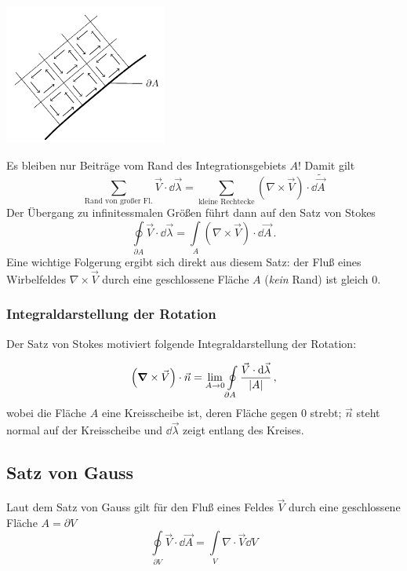 \documentclass[paper=a4, fontsize=11.0pt, abstractoff, DIV12]{scrartcl}
\begin{document}
\begin{center}
    \includegraphics[width=0.4\textwidth]{Figures/Stokes2}
\end{center}
Es bleiben nur Beiträge vom Rand des Integrationsgebiets $A$! Damit gilt 
\begin{equation*}
\sum\limits_{\text{Rand von großer Fl.}} \vec V\cdot \dd \vec\lambda = \sum\limits_{\text{kleine Rechtecke}} \left(\nabla\times\vec V\right)\cdot \dd \tilde{\vec A}
\end{equation*}
Der Übergang zu infinitessmalen Größen führt dann auf den Satz von Stokes
\begin{equation*}
\oint\limits_{\partial A} \vec V \cdot \dd \vec \lambda = \int\limits_{A} \left(\nabla\times\vec V\right)\cdot \dd \vec A\,.
\end{equation*}
Eine wichtige Folgerung ergibt sich direkt aus diesem Satz: der Fluß eines
Wirbelfeldes $\nabla\times\vec V$ durch eine geschlossene Fläche $A$ (\emph
{kein} Rand) ist gleich $0$.

\subsubsection{Integraldarstellung der Rotation}

Der Satz von Stokes motiviert folgende Integraldarstellung der Rotation:

\begin{equation}
\left(\nabla \times \vec V\right)\cdot \vec n = \lim\limits_{A \to 0}  \oint\limits_{\partial A} \frac{\vec V \cdot \dd \vec \lambda}{\abs{A}} \,,
\end{equation}
wobei die Fläche $A$ eine Kreisscheibe ist, deren Fläche gegen $0$ strebt;
$\vec n$ steht normal auf der Kreisscheibe und $\dd \vec \lambda$ zeigt entlang
des Kreises.

\subsection{Satz von Gauss}

Laut dem Satz von Gauss gilt für den Fluß eines Feldes $\vec V$ durch eine
geschlossene Fläche $A = \partial V$
\begin{equation}
\oint\limits_{\partial V} \vec V \cdot \dd \vec A = \int\limits_{V} \nabla \cdot \vec V \dd V
\end{equation}
\end{document}
